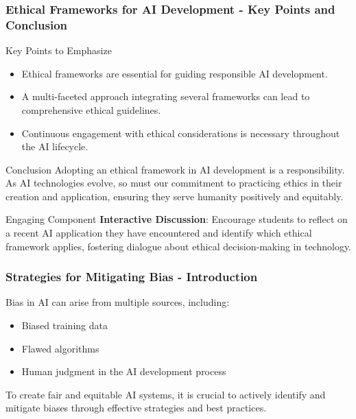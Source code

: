 \documentclass{beamer}
\begin{document}
\begin{frame}[fragile]
    \frametitle{Ethical Frameworks for AI Development - Key Points and Conclusion}
    \begin{block}{Key Points to Emphasize}
        \begin{itemize}
            \item Ethical frameworks are essential for guiding responsible AI development.
            \item A multi-faceted approach integrating several frameworks can lead to comprehensive ethical guidelines.
            \item Continuous engagement with ethical considerations is necessary throughout the AI lifecycle.
        \end{itemize}
    \end{block}

    \begin{block}{Conclusion}
        Adopting an ethical framework in AI development is a responsibility. As AI technologies evolve, so must our commitment to practicing ethics in their creation and application, ensuring they serve humanity positively and equitably.
    \end{block}

    \begin{block}{Engaging Component}
        \textbf{Interactive Discussion}: Encourage students to reflect on a recent AI application they have encountered and identify which ethical framework applies, fostering dialogue about ethical decision-making in technology.
    \end{block}
\end{frame}

\begin{frame}[fragile]
    \frametitle{Strategies for Mitigating Bias - Introduction}
    Bias in AI can arise from multiple sources, including:
    \begin{itemize}
        \item Biased training data
        \item Flawed algorithms
        \item Human judgment in the AI development process
    \end{itemize}
    To create fair and equitable AI systems, it is crucial to actively identify and mitigate biases through effective strategies and best practices.
\end{frame}
\end{document}

